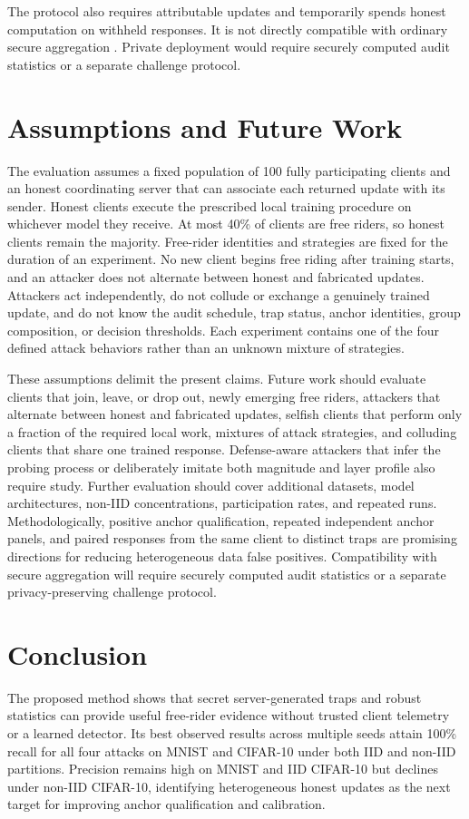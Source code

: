 \documentclass[conference]{IEEEtran}
\begin{document}
The protocol also requires attributable updates and temporarily spends honest computation on withheld responses. It is not directly compatible with ordinary secure aggregation \cite{bonawitz2017practical}. Private deployment would require securely computed audit statistics or a separate challenge protocol.

\section{Assumptions and Future Work}
The evaluation assumes a fixed population of 100 fully participating clients and an honest coordinating server that can associate each returned update with its sender. Honest clients execute the prescribed local training procedure on whichever model they receive. At most 40\% of clients are free riders, so honest clients remain the majority. Free-rider identities and strategies are fixed for the duration of an experiment. No new client begins free riding after training starts, and an attacker does not alternate between honest and fabricated updates. Attackers act independently, do not collude or exchange a genuinely trained update, and do not know the audit schedule, trap status, anchor identities, group composition, or decision thresholds. Each experiment contains one of the four defined attack behaviors rather than an unknown mixture of strategies.

These assumptions delimit the present claims. Future work should evaluate clients that join, leave, or drop out, newly emerging free riders, attackers that alternate between honest and fabricated updates, selfish clients that perform only a fraction of the required local work, mixtures of attack strategies, and colluding clients that share one trained response. Defense-aware attackers that infer the probing process or deliberately imitate both magnitude and layer profile also require study. Further evaluation should cover additional datasets, model architectures, non-IID concentrations, participation rates, and repeated runs. Methodologically, positive anchor qualification, repeated independent anchor panels, and paired responses from the same client to distinct traps are promising directions for reducing heterogeneous data false positives. Compatibility with secure aggregation will require securely computed audit statistics or a separate privacy-preserving challenge protocol.

\section{Conclusion}
The proposed method shows that secret server-generated traps and robust statistics can provide useful free-rider evidence without trusted client telemetry or a learned detector. Its best observed results across multiple seeds attain 100\% recall for all four attacks on MNIST and CIFAR-10 under both IID and non-IID partitions. Precision remains high on MNIST and IID CIFAR-10 but declines under non-IID CIFAR-10, identifying heterogeneous honest updates as the next target for improving anchor qualification and calibration.



\end{document}
